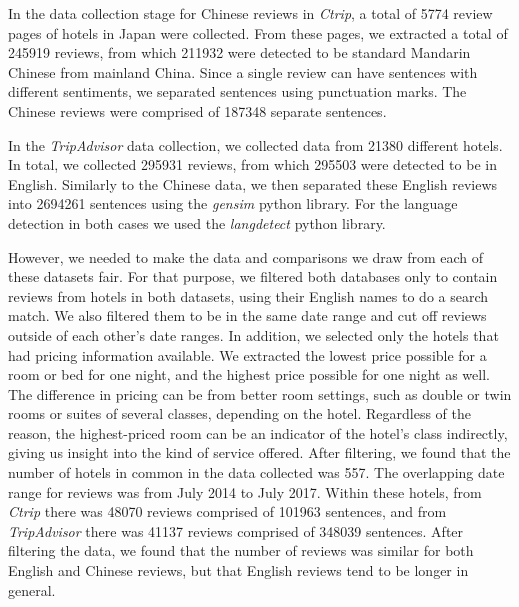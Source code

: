 \documentclass[smallextended,natbib]{svjour3}       %
\begin{document}
    In the data collection stage for Chinese reviews in \textit{Ctrip}, a total of \num[group-separator={,}]{5774} review pages of hotels in Japan were collected. From these pages, we extracted a total of \num[group-separator={,}]{245919} reviews, from which \num[group-separator={,}]{211932} were detected to be standard Mandarin Chinese from mainland China. Since a single review can have sentences with different sentiments, we separated sentences using punctuation marks. The Chinese reviews were comprised of \num[group-separator={,}]{187348} separate sentences. 

    In the \textit{TripAdvisor} data collection, we collected data from \num[group-separator={,}]{21380} different hotels. In total, we collected \num[group-separator={,}]{295931} reviews, from which \num[group-separator={,}]{295503} were detected to be in English. Similarly to the Chinese data, we then separated these English reviews into \num[group-separator={,}]{2694261} sentences using the \textit{gensim} python library. For the language detection in both cases we used the \textit{langdetect} python library.

    However, we needed to make the data and comparisons we draw from each of these datasets fair. For that purpose, we filtered both databases only to contain reviews from hotels in both datasets, using their English names to do a search match. We also filtered them to be in the same date range and cut off reviews outside of each other's date ranges. In addition, we selected only the hotels that had pricing information available. We extracted the lowest price possible for a room or bed for one night, and the highest price possible for one night as well. The difference in pricing can be from better room settings, such as double or twin rooms or suites of several classes, depending on the hotel. Regardless of the reason, the highest-priced room can be an indicator of the hotel's class indirectly, giving us insight into the kind of service offered. After filtering, we found that the number of hotels in common in the data collected was \num[group-separator={,}]{557}. The overlapping date range for reviews was from July 2014 to July 2017. Within these hotels, from \textit{Ctrip} there was \num[group-separator={,}]{48070} reviews comprised of \num[group-separator={,}]{101963} sentences, and from \textit{TripAdvisor} there was \num[group-separator={,}]{41137} reviews comprised of \num[group-separator={,}]{348039} sentences. After filtering the data, we found that the number of reviews was similar for both English and Chinese reviews, but that English reviews tend to be longer in general.
\end{document}
